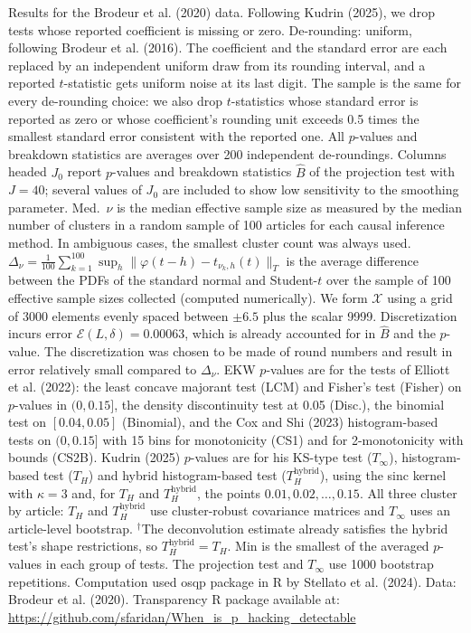 \begin{table}[htbp]
\medskip
\begin{minipage}{\linewidth}
Results for the Brodeur et al. (2020) data. Following Kudrin (2025), we drop tests whose reported coefficient is missing or zero.
De-rounding: uniform, following Brodeur et al. (2016). The coefficient and the standard error are each replaced by an independent uniform draw from its rounding interval, and a reported $t$-statistic gets uniform noise at its last digit.
The sample is the same for every de-rounding choice: we also drop $t$-statistics whose standard error is reported as zero or whose coefficient's rounding unit exceeds 0.5 times the smallest standard error consistent with the reported one.
All $p$-values and breakdown statistics are averages over 200 independent de-roundings.
Columns headed $J_0$ report $p$-values and breakdown statistics $\widehat{B}$ of the projection test with $J=40$; several values of $J_0$ are included to show low sensitivity to the smoothing parameter.
Med.\ $\nu$ is the median effective sample size as measured by the median number of clusters in a random sample of 100 articles for each causal inference method.
In ambiguous cases, the smallest cluster count was always used.
$\Delta_\nu=\frac{1}{100}\sum_{k=1}^{100}\sup_h\|\varphi(t-h)-t_{\nu_k,h}(t)\|_T$ is the average difference between the PDFs of the standard normal and Student-$t$ over the sample of 100 effective sample sizes collected (computed numerically).
We form $\mathcal{X}$ using a grid of 3000 elements evenly spaced between $\pm 6.5$ plus the scalar 9999.
Discretization incurs error $\mathcal{E}(L,\delta)=0.00063$, which is already accounted for in $\widehat{B}$ and the $p$-value.
The discretization was chosen to be made of round numbers and result in error relatively small compared to $\Delta_\nu$.
EKW $p$-values are for the tests of Elliott et al. (2022): the least concave majorant test (LCM) and Fisher's test (Fisher) on $p$-values in $(0,0.15]$, the density discontinuity test at 0.05 (Disc.), the binomial test on $[0.04,0.05]$ (Binomial), and the Cox and Shi (2023) histogram-based tests on $(0,0.15]$ with 15 bins for monotonicity (CS1) and for 2-monotonicity with bounds (CS2B).
Kudrin (2025) $p$-values are for his KS-type test ($T_\infty$), histogram-based test ($T_H$) and hybrid histogram-based test ($T_H^{\mathrm{hybrid}}$), using the sinc kernel with $\kappa=3$ and, for $T_H$ and $T_H^{\mathrm{hybrid}}$, the points $0.01,0.02,\ldots,0.15$.
All three cluster by article: $T_H$ and $T_H^{\mathrm{hybrid}}$ use cluster-robust covariance matrices and $T_\infty$ uses an article-level bootstrap.
$^\dagger$The deconvolution estimate already satisfies the hybrid test's shape restrictions, so $T_H^{\mathrm{hybrid}}=T_H$.
Min is the smallest of the averaged $p$-values in each group of tests.
The projection test and $T_\infty$ use 1000 bootstrap repetitions.
Computation used osqp package in R by Stellato et al. (2024). Data: Brodeur et al. (2020).
Transparency R package available at: \url{https://github.com/sfaridan/When_is_p_hacking_detectable}
\end{minipage}
\end{table}
